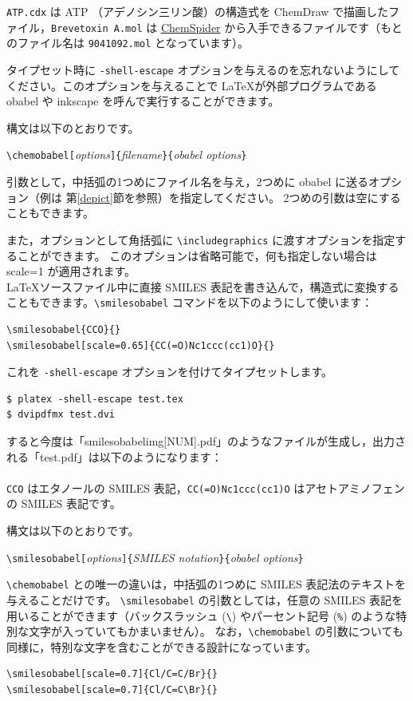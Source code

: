 \documentclass[12pt]{jsarticle}
\begin{document}
\verb|ATP.cdx| は ATP （アデノシン三リン酸）の構造式を ChemDraw で描画したファイル，\verb|Brevetoxin A.mol| は \href{http://www.chemspider.com/}{ChemSpider} から入手できるファイルです（もとのファイル名は \verb|9041092.mol| となっています）。

タイプセット時に \verb|-shell-escape| オプションを与えるのを忘れないようにしてください。このオプションを与えることで \LaTeX が外部プログラムである obabel や inkscape を呼んで実行することができます。

構文は以下のとおりです。
\begin{center}
\verb|\chemobabel[|\textit{options}\verb|]{|\textit{filename}\verb|}{|\textit{obabel options}\verb|}|
\end{center}
引数として，中括弧の1つめにファイル名を与え，2つめに obabel に送るオプション（例は
第\ref{depict}節を参照）を指定してください。
2つめの引数は空にすることもできます。

また，オプションとして角括弧に \verb|\includegraphics| に渡すオプションを指定することができます。
このオプションは省略可能で，何も指定しない場合は scale=1 が適用されます。 \\

\LaTeX ソースファイル中に直接 SMILES 表記を書き込んで，構造式に変換することもできます。\verb|\smilesobabel| コマンドを以下のようにして使います：
\begin{verbatim}
\smilesobabel{CCO}{}
\smilesobabel[scale=0.65]{CC(=O)Nc1ccc(cc1)O}{}
\end{verbatim}
これを \verb|-shell-escape| オプションを付けてタイプセットします。
\begin{verbatim}
$ platex -shell-escape test.tex
$ dvipdfmx test.dvi
\end{verbatim}
すると今度は「smilesobabelimg[NUM].pdf」のようなファイルが生成し，出力される「test.pdf」は以下のようになります： \\
 \\
\verb|CCO| はエタノールの SMILES 表記，\verb|CC(=O)Nc1ccc(cc1)O| はアセトアミノフェンの SMILES 表記です。

構文は以下のとおりです。
\begin{center}
\verb|\smilesobabel[|\textit{options}\verb|]{|\textit{SMILES notation}\verb|}{|\textit{obabel options}\verb|}|
\end{center}
\verb|\chemobabel| との唯一の違いは，中括弧の1つめに SMILES 表記法のテキストを与えることだけです。
\verb|\smilesobabel| の引数としては，任意の SMILES 表記を用いることができます（バックスラッシュ (\verb|\|) やパーセント記号 (\verb|%|) のような特別な文字が入っていてもかまいません）。
なお，\verb|\chemobabel| の引数についても同様に，特別な文字を含むことができる設計になっています。
\begin{verbatim}
\smilesobabel[scale=0.7]{Cl/C=C/Br}{}
\smilesobabel[scale=0.7]{Cl/C=C\Br}{}
\end{verbatim}
\end{document}
